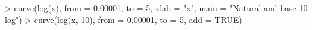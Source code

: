 \begin{Schunk}
\begin{Sinput}
> curve(log(x), from = 0.00001, to = 5, xlab = "x", main = "Natural and base 10 log")
> curve(log(x, 10), from = 0.00001, to = 5, add = TRUE)
\end{Sinput}
\end{Schunk}
